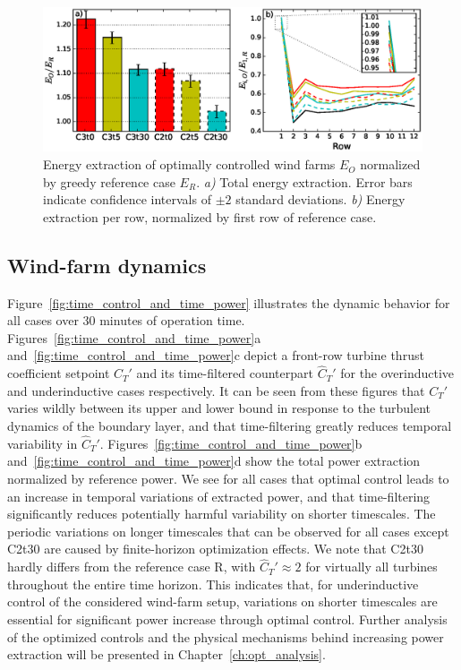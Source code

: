 \begin{figure}
	\centering
	\includegraphics[width=\linewidth]{chapters/philtrans_torque/figure8.eps}
	\caption[Energy extraction of optimally controlled wind farms $E_O$ normalized by greedy reference case $E_R$.]{Energy extraction of optimally controlled wind farms $E_O$ normalized by greedy reference case $E_R$. \emph{a) } Total energy extraction. Error bars indicate confidence intervals of $\pm 2$ standard deviations. \emph{b) } Energy extraction per row, normalized by first row of reference case. \legend \label{fig:bar_and_row}}
\end{figure}

\subsection{Wind-farm dynamics}\label{sec:opt_ind_dyn}
Figure~\ref{fig:time_control_and_time_power} illustrates the dynamic behavior for all cases over 30 minutes of operation time. Figures~\ref{fig:time_control_and_time_power}a and~\ref{fig:time_control_and_time_power}c depict a front-row turbine thrust coefficient setpoint $C_T'$ and its time-filtered counterpart $\widehat{C}_T'$ for the overinductive and underinductive cases respectively. It can be seen from these figures that $C_T'$ varies wildly between its upper and lower bound in response to the turbulent dynamics of the boundary layer, and that time-filtering greatly reduces temporal variability in $\widehat{C}_T'$. Figures~\ref{fig:time_control_and_time_power}b and~\ref{fig:time_control_and_time_power}d show the total power extraction normalized by reference power. We see for all cases that optimal control leads to an increase in temporal variations of extracted power, and that time-filtering significantly reduces potentially harmful variability on shorter timescales. The periodic variations on longer timescales that can be observed for all cases except C2t30 are caused by finite-horizon optimization effects.
We note that C2t30 hardly differs from the reference case R, with $\widehat{C}_T' \approx 2$ for virtually all turbines throughout the entire time horizon. This indicates that, for underinductive control of the considered wind-farm setup, variations on shorter timescales are essential for significant power increase through optimal control. Further analysis of the optimized controls and the physical mechanisms behind increasing power extraction will be presented in Chapter~\ref{ch:opt_analysis}. 


